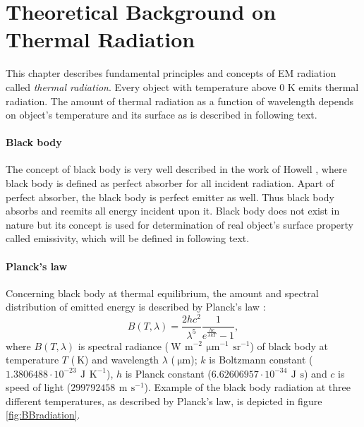 \chapter{Theoretical Background on Thermal Radiation}

This chapter describes fundamental principles and concepts of EM radiation called \textit{thermal radiation}. Every object with temperature above 0 K emits thermal radiation. The amount of thermal radiation as a function of wavelength depends on object's temperature and its surface as is described in following text.

\subsubsection*{Black body}
The concept of black body is very well described in the work of Howell \cite{H11}, where black body is defined as perfect absorber for all incident radiation. Apart of perfect absorber, the black body is perfect emitter as well. Thus black body absorbs and reemits all energy incident upon it. Black body does not exist in nature but its concept is used for determination of real object's surface property called emissivity, which will be defined in following text. 

\subsubsection*{Planck's law}
Concerning black body at thermal equilibrium, the amount and spectral distribution of emitted energy is described by Planck’s law \cite{P00}:
$$B(T,\lambda) = \frac{2hc^2}{\lambda^5}\frac{1}{e^{\frac{hc}{\lambda k T}}-1},$$
where $B(T,\lambda)$ is spectral radiance ($\SI{}{\watt}\,\SI{}{\meter}^{-2}\,\SI{}{\micro\meter}^{-1}\,\SI{}{\steradian}^{-1}$) of black body at temperature $T$ ($\SI{}{\kelvin}$) and wavelength $\lambda$ ($\SI{}{\micro\meter}$); $k$ is Boltzmann constant ($1.3806488\cdot10^{-23}\,\SI{}{\joule}\,\SI{}{\kelvin}^{-1}$), $h$ is Planck constant ($6.62606957\cdot10^{-34}\,\SI{}{\joule}\,\SI{}{\second}$) and $c$ is speed of light ($299792458\,\SI{}{\meter}\,\SI{}{\second}^{-1}$). Example of the black body radiation at three different temperatures, as described by Planck's law, is depicted in figure \ref{fig:BBradiation}.

